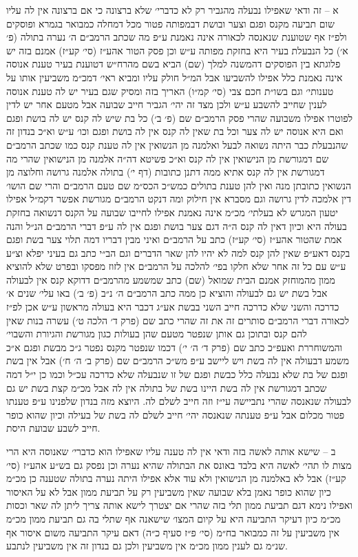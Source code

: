 \documentclass[12pt, openany]{book}
\begin{document}
\begin{multicols}{2}
א – זה ודאי שאפילו נבעלה מהגביר רק לא כדברי׳ שלא ברצונה כי אם ברצונה אין לה עליו שום תביעה מקנס ופגם וצער ובושת דבמפותה פטור מכל דמחלה כמבואר בגמרא ופוסקים ולפ״ז אף שטוענת שנאנסה לכאורה אינה נאמנת ע״פ מה שכתב הרמב״ם ה׳ נערה בתולה (פ׳ א׳) כל הנבעלת בעיר היא בחזקת מפותה ע״ש וכן פסק הטור אהע״ז (סי׳ קע״ז) אמנם בזה יש פלוגתא בין הפוסקים דהמשנה למלך (שם) הביא בשם מהרח״ש דטוענת בעיר טענת אנוסה אינה נאמנת כלל אפילו להשביעו אבל המ״ל חולק עליו ומביא ראי׳ דמכ״מ משביעין אותו על טענותי׳ וגם בשו״ת חכם צבי (סי׳ קמ״ו) האריך בזה ומסיק שגם בעיר יש לה טענת אנוסה לענין שחייב להשבע ע״ש ולכן מצד זה יהי׳ הגביר חייב שבועה אבל מטעם אחר יש לדין לפוטרו אפילו משבועה שהרי פסק הרמב״ם שם (פ׳ ב׳) כל בת שיש לה קנס יש לה בושת ופגם ואם היא אנוסה יש לה צער וכל בת שאין לה קנס אין לה בושת ופגם וכו׳ ע״ש וא״כ בנדון זה שהנבעלת כבר היתה נשואה לבעל ואלמנה מן הנשואין אין לה טענת קנס כמו שכתב הרמב״ם שם דמגורשת מן הנישואין אין לה קנס וא״כ פשיטא דה״ה אלמנה מן הנישואין שהרי מה דמגורשת אין לה קנס אתיא ממה דתנן כתובות (דף י׳) בתולה אלמנה גרושה וחלוצה מן הנשואין כתובתן מנה ואין להן טענת בתולים כמש״כ הכס״מ שם טעם הרמב״ם והרי שם הושו׳ דין אלמכה לדין גרושה וגם מסברא אין חילוק ומה דנקט הרמב״ם מגורשת אפשר דקמ״ל אפילו יטעון המגרש לא בעלתי׳ מכ״מ אינה נאמנת אפילו לחייבו שבועה על הקנס דנשואה בחזקת בעולה היא וכיון דאין לה קנס ה״ה דגם צער בושת ופגם אין לה ע״פ דברי הרמב״ם הנ״ל והנה אמת שהטור אהע״ז (סי׳ קע״ז) כתב על הרמב״ם ואיני מבין דבריו דמה תלוי צער בשת ופגם בקנס דאע״פ שאין להן קנס למה לא יהיו להן שאר הדברים וגם הב״י כתב גם בעיני יפלא וצ״ע ע״ש עם כל זה אחר שלא חלקו בפי׳ להלכה על הרמב״ם אין לזוז מפסקו ובפרט שלא להוציא ממון מהמוחזק אמנם הבית שמואל (שם) כתב שמשמע מהרמב״ם דדוקא קנס אין לבעולה אבל בשת יש גם לבעולה והוציא כן ממה כתב הרמב״ם ה׳ נ״ב (פ׳ ב׳) באו עלי׳ שנים א׳ כדרכה והשני שלא כדרכה חייב השני בבשת אע״ג דכבר היא בעולה מראשון ע״ש אכן לפ״ז לכאורה דברי הרמב״ם סותרים זה את זה שהרי כתב שם (פרק ד׳ הלכה ט׳) עשרה בנות שאין להם קנס ובתוכן גם אותן שנפטר מטעם שהן בעולות כגון מגורשת והגיורת והשבוי׳ והמשוחררת ואעפ״כ כתב שם (פרק ד׳ ה׳ י׳) דכמו שנפטר מקנס נפטר ג״כ מבשת ופגם א״כ משמע דבעולה אין לה בשת ויש ליישב ע״פ מש״כ הרמב״ם שם (פרק ב׳ ה׳ ח׳) אבל אין בשת ופגם של בת שלא נבעלה כלל כבשת ופגם של זו שנבעלה שלא כדרכה עכ״ל וכמו כן י״ל דמה שכתב דמגורשת אין לה בשת היינו בשת של בתולה אין לה אבל מכ״מ קצת בשת יש גם לבעולה שנאנסה שהרי נתביישה עי״ז וזה חייב לשלם לה. היוצא מזה בנדון שלפנינו ע״פ טענתו פטור מכלום אבל ע״פ טענתה שנאנסה יהי׳ חייב לשלם לה בשת של בעילה וכיון שהוא כופר חייב לשבע שבועת היסת.\\\vspace{0pt}

ב – שישא אותה לאשה בזה ודאי אין לה טענה עליו שאפילו הוא כדברי׳ שאנוסה היא הרי מצות לו תהי׳ לאשה היא בלבד באונס את הבתולה שהיא נערה וכן נפסק גם בש״ע אהע״ז (סי׳ קע״ז) אבל לא באלמנה מן הנישואין ולא עוד אלא אפילו היתה נערה בתולה שטענה כן מכ״מ כיון שהוא כופר נאמן בלא שבועה שאין משביעין רק על תביעת ממון אבל לא על האיסור ואפילו נימא דגם תביעת ממון תלי בזה שהרי אם יצטרך לישא אותה צריך ליתן לה שאר וכסות מכ״מ כיון דעיקר התביעה היא על קיום המצו׳ שישאנה אף שתלי בה גם תביעת ממון מכ״מ אין משביעין על זה כמבואר בח״מ (סי׳ פ״ז סעיף כ״ה) דאם עיקר התביעה משום איסור אף שנ״מ גם לענין ממון מכ״מ אין משביעין ולכן גם בנדון זה אין משביעין לנתבע.\\\vspace{0pt}


\end{multicols}
\end{document}
